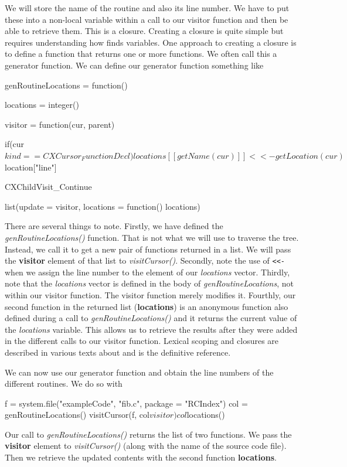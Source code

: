 \documentclass[article]{jss}
\def\R{\proglang{R}}
\def\Rfunc#1{\textsl{#1()}}
\def\Rvar#1{\textsl{#1}}
\def\Rel#1{\textbf{#1}}
\begin{document}
We will store the name of the routine and also its line number.
We have to put these into a non-local variable within a call to our
visitor  function and then be able to retrieve them. This is a closure.
Creating a closure is quite simple but requires understanding how \R{}
finds variables.  One approach to creating a closure is to define a
function that returns one or more functions.  We often call this a
generator function.
We can define our generator function something like
\begin{RCode}
genRoutineLocations = 
function() 
{
   locations = integer()

    visitor = function(cur, parent) {
       if(cur$kind == CXCursor_FunctionDecl) 
         locations[[ getName(cur) ]] <<- getLocation(cur)$location["line"]

        CXChildVisit_Continue
    }

    list(update = visitor, locations = function() locations)
}
\end{RCode}
There are several things to note.  Firstly, we have defined the
\Rfunc{genRoutineLocations} function. That is not what we will use to
traverse the tree. Instead, we call it to get a new pair of functions
returned in a list.  We will pass the \Rel{visitor} element of that
list to \Rfunc{visitCursor}.  Secondly, note the use of \verb+<<-+
when we assign the line number to the element of our \Rvar{locations}
vector.  Thirdly, note that the \Rvar{locations} vector is defined in
the body of \Rvar{genRoutineLocations}, not within our visitor
function. The visitor function merely modifies it.  Fourthly, our
second function in the returned list (\Rel{locations}) is an anonymous
function also defined during a call to \Rfunc{genRoutineLocations} and
it returns the current value of the \Rvar{locations} variable.  This
allows us to retrieve the results after they were added in the
different calls to our visitor function.  Lexical scoping and closures
are described in various texts about \R and \cite{bib:LexicalScoping}
is the definitive reference.

We can now use our generator function and obtain the line numbers of
the different routines. We do so with
\begin{RCode}
f = system.file("exampleCode", "fib.c", package = "RCIndex")
col = genRoutineLocations()
visitCursor(f, col$visitor)
col$locations()
\end{RCode}
Our call to \Rfunc{genRoutineLocations} returns the list of two
functions.
We pass the \Rel{visitor} element  to \Rfunc{visitCursor} (along with
the name of the source code file).
Then we retrieve the updated contents with the second function \Rel{locations}.
\end{document}
